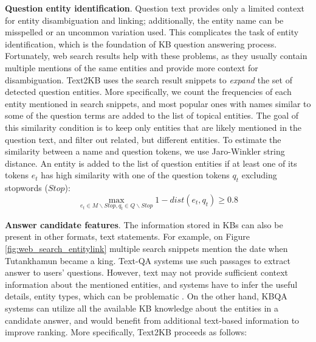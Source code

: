 \textbf{Question entity identification}.
Question text provides only a limited context for entity disambiguation and linking; additionally, the entity name can be misspelled or an uncommon variation used.
This complicates the task of entity identification, which is the foundation of KB question answering process.
Fortunately, web search results help with these problems, as they usually contain multiple mentions of the same entities and provide more context for disambiguation.
Text2KB uses the search result snippets to \textit{expand} the set of detected question entities.
More specifically, we count the frequencies of each entity mentioned in search snippets, and most popular ones with names similar to some of the question terms are added to the list of topical entities.
The goal of this similarity condition is to keep only entities that are likely mentioned in the question text, and filter out related, but different entities.
To estimate the similarity between a name and question tokens, we use Jaro-Winkler string distance.
An entity is added to the list of question entities if at least one of its tokens $e_t$ has high similarity with one of the question tokens $q_t$ excluding stopwords ($Stop$):
$$\max_{e_t \in M\backslash Stop, q_t \in Q\backslash Stop} 1 - dist(e_t, q_t) \geq 0.8$$

\textbf{Answer candidate features}.
The information stored in KBs can also be present in other formats, \eg text statements.
For example, on Figure \ref{fig:web_search_entitylink} multiple search snippets mention the date when Tutankhamun became a king.
Text-QA systems use such passages to extract answer to users' questions.
However, text may not provide sufficient context information about the mentioned entities, and systems have to infer the useful details, \eg entity types, which can be problematic \cite{yih2015semantic}.
On the other hand, KBQA systems can utilize all the available KB knowledge about the entities in a candidate answer, and would benefit from additional text-based information to improve ranking.
More specifically, Text2KB proceeds as follows:

